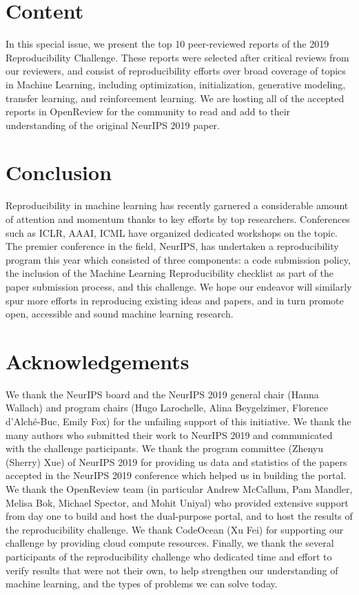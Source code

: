 \section{Content}

In this special issue, we present the top 10 peer-reviewed reports of the 2019 Reproducibility Challenge. These reports were selected after critical reviews from our reviewers, and consist of reproducibility efforts over broad coverage of topics in Machine Learning, including optimization, initialization, generative modeling, transfer learning, and reinforcement learning. We are hosting all of the accepted reports in OpenReview for the community to read and add to their understanding of the original NeurIPS 2019 paper. 


\section{Conclusion} 

Reproducibility in machine learning has recently garnered a considerable amount of attention and momentum thanks to key efforts by top researchers. Conferences such as ICLR, AAAI, ICML have organized dedicated workshops on the topic. The premier conference in the field, NeurIPS, has undertaken a reproducibility program this year which consisted of three components: a code submission policy, the inclusion of the Machine Learning Reproducibility checklist as part of the paper submission process, and this challenge. We hope our endeavor will similarly spur more efforts in reproducing existing ideas and papers, and in turn promote open, accessible and sound machine learning research.
            

\section{Acknowledgements} 

We thank the NeurIPS board and the NeurIPS 2019 general chair (Hanna Wallach) and program chairs (Hugo Larochelle, Alina Beygelzimer, Florence d’Alché-Buc, Emily Fox) for the unfailing support of this initiative. We thank the many authors who submitted their work to NeurIPS 2019 and communicated with the challenge participants. We thank the program committee (Zhenyu (Sherry) Xue) of NeurIPS 2019 for providing us data and statistics of the papers accepted in the NeurIPS 2019 conference which helped us in building the portal. We thank the OpenReview team (in particular Andrew McCallum, Pam Mandler, Melisa Bok, Michael Spector, and Mohit Uniyal) who provided extensive support from day one to build and host the dual-purpose portal, and to host the results of the reproducibility challenge. We thank CodeOcean (Xu Fei) for supporting our challenge by providing cloud compute resources. Finally, we thank the several participants of the reproducibility challenge who dedicated time and effort to verify results that were not their own, to help strengthen our understanding of machine learning, and the types of problems we can solve today.


